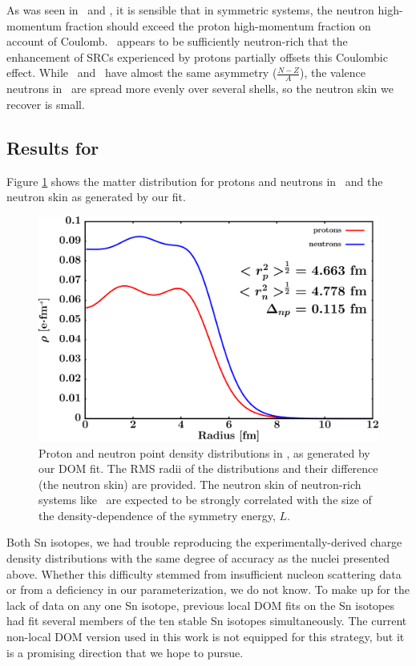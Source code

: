 As was seen in \oSix\ and \caForty, it is sensible that in symmetric systems,
the neutron high-momentum fraction
should exceed the proton high-momentum fraction on account of Coulomb. \snTwelve\
appears to be sufficiently neutron-rich that the enhancement of SRCs experienced by protons
partially offsets this Coulombic effect. While \snTwelve\ and \oEight\ have almost the same asymmetry
($\frac{N-Z}{A}$), the valence neutrons in \snTwelve\ are spread more evenly over several
shells, so the neutron skin we recover is small.
\subsection{Results for \snFour}
Figure \ref{Sn124MatterDistribution} shows the matter distribution for protons and neutrons in
\snFour\ and the neutron skin as generated by our fit.
\begin{figure}[tb]
    \centering
    \includegraphics[width=\textwidth]{figures/sn124_matterDensity.png}
    \caption[Proton and neutron matter density distributions in \snFour]
    {
        Proton and neutron point density distributions in \snFour, as
        generated by our DOM fit. The RMS radii of the distributions and their
        difference (the neutron skin) are provided. The neutron skin of
        neutron-rich systems like \snFour\ are expected to be strongly correlated
        with the size of the density-dependence of the symmetry energy, $L$.
    }
    \label{Sn124MatterDistribution}
\end{figure}
Both Sn isotopes, we had trouble
reproducing the experimentally-derived charge density distributions with
the same degree of accuracy as the nuclei presented above.
Whether this difficulty stemmed from insufficient nucleon scattering
data or from a deficiency in our parameterization, we do not know. To make up for the lack of data
on any one Sn isotope, previous local DOM fits on the Sn isotopes \cite{Charity2006, Mueller2011}
had fit several members of the ten stable Sn isotopes simultaneously.
The current non-local DOM version used in this work is not equipped for this strategy, but it is a
promising direction that we hope to pursue.

